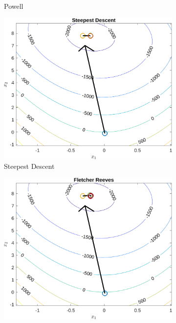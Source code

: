 \documentclass[10pt, a4paper]{article}
\begin{document}
\begin{figure}[H]
\begin{subfigure}{0.45\textwidth}
            \caption{Powell}
            \label{fig:graf02_m02}
      \end{subfigure}
      \begin{subfigure}{0.45\textwidth}
            \centering
            \includegraphics[width=\textwidth]{img02_m03.png}
            \caption{Steepest Descent}
            \label{fig:graf02_m03}
      \end{subfigure}
      \begin{subfigure}{0.45\textwidth}
            \centering
            \includegraphics[width=\textwidth]{img02_m04.png}

\end{subfigure}
\end{figure}
\end{document}
